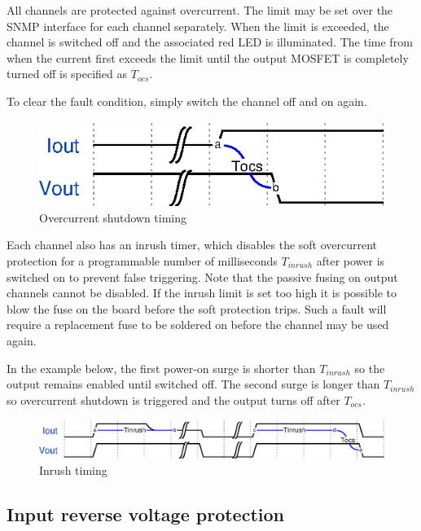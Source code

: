 \documentclass{article}
\begin{document}
All channels are protected against overcurrent. The limit may be set over the SNMP interface for each channel 
separately. When the limit is exceeded, the channel is switched off and the associated red LED is illuminated. The 
time from when the current first exceeds the limit until the output MOSFET is completely turned off is specified as 
$T_{ocs}$.

To clear the fault condition, simply switch the channel off and on again.

\begin{figure}[h!]
\includegraphics[scale=0.8]{Tocs.eps}
\caption{Overcurrent shutdown timing}
\label{tocs}
\end{figure}
\FloatBarrier

Each channel also has an inrush timer, which disables the soft overcurrent protection for a programmable number of 
milliseconds $T_{inrush}$ after power is switched on to prevent false triggering. Note that the passive fusing on 
output channels cannot be disabled. If the inrush limit is set too high it is possible to blow the fuse on the board 
before the soft protection trips. Such a fault will require a replacement fuse to be soldered on before the channel 
may be used again.

In the example below, the first power-on surge is shorter than $T_{inrush}$ so the output remains enabled until 
switched off. The second surge is longer than $T_{inrush}$ so overcurrent shutdown is triggered and the output turns 
off after $T_{ocs}$.

\begin{figure}[h!]
\includegraphics[scale=0.8]{Tinrush.eps}
\caption{Inrush timing}
\label{tinrush}
\end{figure}
\FloatBarrier

\subsection{Input reverse voltage protection}
\end{document}
